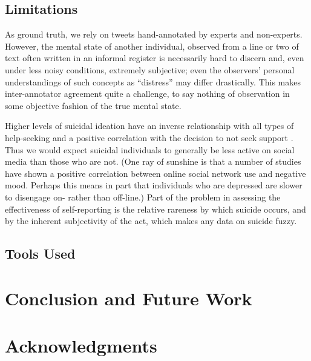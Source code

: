 \documentclass[11pt]{article}
\begin{document}
\subsection{Limitations}
As ground truth, we rely on tweets hand-annotated by experts and non-experts. However, the mental state of another individual, observed from a line or two of text  often written in an informal register is necessarily hard to discern and, even under less noisy conditions, extremely subjective; even the observers' personal understandings of such concepts as ``distress'' may differ drastically. This makes inter-annotator agreement quite a challenge, to say nothing of observation in some objective fashion of the true mental state.


Higher levels of suicidal ideation have an inverse relationship with all types of help-seeking and a positive correlation with the decision to not seek support \cite{deane2001suicidal}. Thus we would expect suicidal individuals to generally be less active on social media than those who are not. (One ray of sunshine is that a number of studies have shown a positive correlation between online social network use and negative mood. Perhaps this means in part that individuals who are depressed are slower to disengage on- rather than off-line.)
 Part of the problem in assessing the effectiveness of self-reporting is the relative rareness by which suicide occurs, and by the inherent subjectivity of the act, which makes any data on suicide fuzzy.


\subsection{Tools Used}
 
\section{Conclusion and Future Work}
\section*{Acknowledgments}





\end{document}

